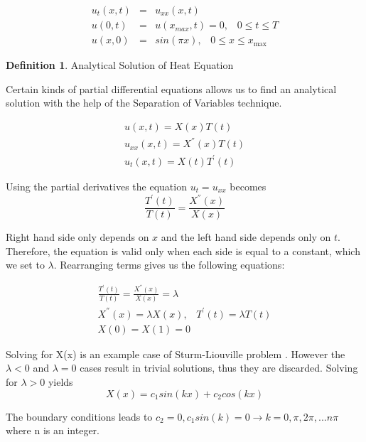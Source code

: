 \documentclass[12pt, oneside]{book}
\theoremstyle{plain}
\theoremstyle{definition}
\newtheorem{definition}[theorem]{Definition}
\begin{document}
\begin{eqnarray} \label{HeatBase}
u_t(x,t) &=& u_{xx}(x, t) \\[10pt]
u(0, t) &=& u(x_{max}, t) = 0, \hspace{10pt} 0 \leq t \leq T \\[10pt]
u(x, 0) &=& sin(\pi x), \hspace{10pt} 0 \leq x \leq x_{\max}
\end{eqnarray}

\begin{definition}\label{heatAnal} Analytical Solution of Heat Equation

Certain kinds of partial differential equations allows us to find an analytical solution with the help of the Separation of Variables technique.

\begin{eqnarray}
u(x,t) = X(x) T(t) \\[10pt]
u_{xx}(x, t) = X^{''}(x) T(t) \\[10pt]
u_t (x,t) = X(t) T^{'}(t)
\end{eqnarray}

Using the partial derivatives the equation $ u_t = u_{xx} $ becomes
\begin{equation}
\frac{T^{'}(t)}{T(t)}  = \frac{X^{''}(x)}{X(x)}
\end{equation}

Right hand side only depends on $x$ and the left hand side depends only on $t$. Therefore, the equation is valid only when each side is equal to a constant, which we set to $ \lambda $. Rearranging terms gives us the following equations:

\begin{eqnarray}
\frac{T^{'}(t)}{T(t)}  = \frac{X^{''}(x)}{X(x)} = \lambda \\[10pt]
X^{''}(x) = \lambda X(x), \hspace{10pt} T^{'}(t) = \lambda T(t) \\[10pt]
X(0) = X(1) = 0
\end{eqnarray}

Solving for X(x) is an example case of Sturm-Liouville problem \cite{sepvar}. However the $\lambda < 0$ and $\lambda = 0$ cases result in trivial solutions, thus they are discarded. Solving for $\lambda > 0$ yields
\begin{equation}
X(x)= c_1 sin(kx) + c_2 cos(kx)
\end{equation}

The boundary conditions leads to $ c_2 = 0, c_1 sin(k) = 0 \rightarrow k = 0, \pi, 2\pi, ...n\pi$ where n is an integer.


\end{definition}
\end{document}

